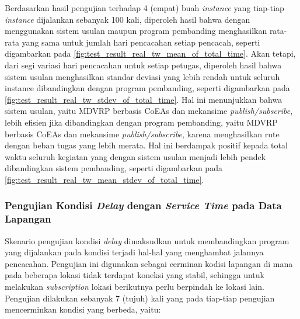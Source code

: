 Berdasarkan hasil pengujian terhadap 4 (empat) buah \textit{instance} yang tiap-tiap \textit{instance} dijalankan sebanyak 100 kali, diperoleh hasil bahwa dengan menggunakan sistem usulan maupun program pembanding menghasilkan rata-rata yang sama untuk jumlah hari pencacahan setiap pencacah, seperti digambarkan pada \autoref{fig:test_result_real_tw_mean_of_total_time}. Akan tetapi, dari segi variasi hari pencacahan untuk setiap petugas, diperoleh hasil bahwa sistem usulan menghasilkan standar deviasi yang lebih rendah untuk seluruh instance dibandingkan dengan program pembanding, seperti digambarkan pada \autoref{fig:test_result_real_tw_stdev_of_total_time}. Hal ini menunjukkan bahwa sistem usulan, yaitu MDVRP berbasis CoEAs dan mekansime \textit{publish/subscribe}, lebih efisien jika dibandingkan dengan program pembanding, yaitu MDVRP berbasis CoEAs dan mekansime \textit{publish/subscribe}, karena menghasilkan rute dengan beban tugas yang lebih merata. Hal ini berdampak positif kepada total waktu seluruh kegiatan yang dengan sistem usulan menjadi lebih pendek dibandingkan sistem pembanding, seperti digambarkan pada \autoref{fig:test_result_real_tw_mean_stdev_of_total_time}.


\subsubsection{Pengujian Kondisi \textit{Delay} dengan \textit{Service Time} pada Data Lapangan}
\label{sssec:test-delay-service-time}
Skenario pengujian kondisi \textit{delay} dimaksudkan untuk membandingkan program yang dijalankan pada kondisi terjadi hal-hal yang menghambat jalannya pencacahan. Pengujian ini digunakan sebagai cerminan kodisi lapangan di mana pada beberapa lokasi tidak terdapat koneksi yang stabil, sehingga untuk melakukan \textit{subscription} lokasi berikutnya perlu berpindah ke lokasi lain. Pengujian dilakukan sebanyak 7 (tujuh) kali yang pada tiap-tiap pengujian mencerminkan kondisi yang berbeda, yaitu:

